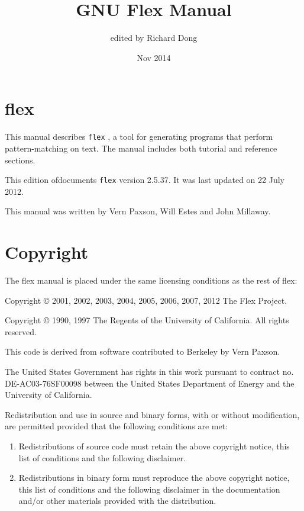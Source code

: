 \documentclass[openany,oneside]{book}
\title{GNU Flex Manual}
\author{edited by Richard Dong}
\date{Nov 2014}
\begin{document}
\maketitle

\frontmatter

\chapter{flex}


This manual describes \verb`flex` , a tool for generating programs that
perform pattern-matching on text.  The manual includes both tutorial and
reference sections.

This edition ofdocuments \verb`flex` version
2.5.37. It was last updated on 22 July 2012.

This manual was written by Vern Paxson, Will Estes and John Millaway.

\tableofcontents

\chapter{Copyright}


The flex manual is placed under the same licensing conditions as the
rest of flex:

Copyright © 2001, 2002, 2003, 2004, 2005, 2006, 2007, 2012
The Flex Project.

Copyright © 1990, 1997 The Regents of the University of California. 
All rights reserved.

This code is derived from software contributed to Berkeley by
Vern Paxson.

The United States Government has rights in this work pursuant
to contract no. DE-AC03-76SF00098 between the United States
Department of Energy and the University of California.

Redistribution and use in source and binary forms, with or without
modification, are permitted provided that the following conditions
are met:
\begin{enumerate}
\item Redistributions of source code must retain the above copyright
notice, this list of conditions and the following disclaimer.
\item Redistributions in binary form must reproduce the above copyright
notice, this list of conditions and the following disclaimer in the
documentation and/or other materials provided with the distribution.
\end{enumerate}
\end{document}

